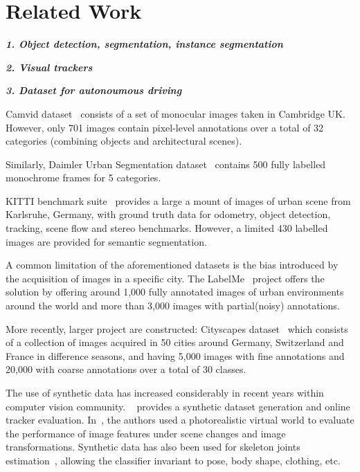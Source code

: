 \documentclass[10pt,twocolumn,letterpaper]{article}
\begin{document}
\section{Related Work}

\textbf{\emph{1. Object detection, segmentation, instance segmentation}}

\textbf{\emph{2. Visual trackers}}


\textbf{\emph{3. Dataset for autonoumous driving}}

Camvid dataset~\cite{Camvid} consists of a set of monocular images taken in Cambridge UK. However, only 701 images contain pixel-level annotations over a total of 32 categories (combining objects and architectural scenes).

Similarly, Daimler Urban Segmentation dataset~\cite{scharwachter2013efficient} contains 500 fully labelled monochrome frames for 5 categories.

KITTI benchmark suite~\cite{Geiger2013IJRR} provides a large a mount of images of urban scene from Karlsruhe, Germany, with ground truth data for odometry, object detection, tracking, scene flow and stereo benchmarks. However, a limited 430 labelled images are provided for semantic segmentation.

A common limitation of the aforementioned datasets is the bias introduced by the acquisition of images in a specific city. The LabelMe~\cite{russell2008labelme} project offers the solution by offering around 1,000 fully annotated images of urban environments around the world and more than 3,000 images with partial(noisy) annotations.

More recently, larger project are constructed:
Cityscapes dataset~\cite{Cordts2016Cityscapes} which consists of a collection of images acquired in 50 cities around Germany, Switzerland and France in difference seasons, and having 5,000 images with fine annotations and 20,000 with coarse annotations over a total of 30 classes.

The use of synthetic data has increased considerably in recent years within computer vision community. ~\cite{mueller2016benchmark} provides a synthetic dataset generation and online tracker evaluation. In~\cite{kaneva2011evaluation}, the authors used a photorealistic virtual world to evaluate the performance of image features under scene changes and image transformations. Synthetic data has also been used for skeleton joints estimation~\cite{shotton2013real}, allowing the classifier invariant to pose, body shape, clothing, etc.
\end{document}
